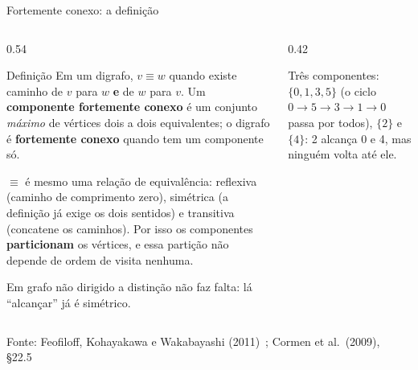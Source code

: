 \documentclass[aspectratio=169]{beamer}
\newcommand{\fonte}[1]{\vfill{\tiny\color{gray!60!black}Fonte: #1\par}}
\begin{document}
\begin{frame}{Fortemente conexo: a definição}
  \begin{columns}[T]
    \begin{column}{0.54\textwidth}
      \begin{block}{Definição}
        {\scriptsize Em um digrafo, $v \equiv w$ quando existe caminho de $v$
        para $w$ \textbf{e} de $w$ para $v$. Um \textbf{componente fortemente
        conexo} é um conjunto \emph{máximo} de vértices dois a dois
        equivalentes; o digrafo é \textbf{fortemente conexo} quando tem um
        componente só.}
      \end{block}
      \vspace{-6pt}
      {\scriptsize $\equiv$ é mesmo uma relação de equivalência: reflexiva
      (caminho de comprimento zero), simétrica (a definição já exige os dois
      sentidos) e transitiva (concatene os caminhos). Por isso os componentes
      \textbf{particionam} os vértices, e essa partição não depende de ordem de
      visita nenhuma.

      \smallskip
      Em grafo não dirigido a distinção não faz falta: lá ``alcançar'' já é
      simétrico.}
    \end{column}
    \begin{column}{0.42\textwidth}
      \begin{center}
      \end{center}
      \vspace{-4pt}
      {\scriptsize Três componentes: $\{0,1,3,5\}$ (o ciclo
      $0\!\to\!5\!\to\!3\!\to\!1\!\to\!0$ passa por todos), $\{2\}$ e $\{4\}$:
      2 alcança 0 e 4, mas ninguém volta até ele.}
    \end{column}
  \end{columns}
  \fonte{Feofiloff, Kohayakawa e Wakabayashi (2011)~\cite{feofiloff2011teoriagrafos}; Cormen et al.\ (2009), \S 22.5~\cite{cormen2009introduction}}
\end{frame}
\end{document}
